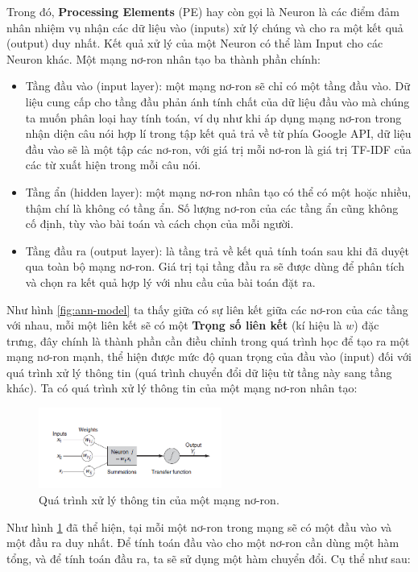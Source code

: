 \documentclass[12pt]{report}
\begin{document}
Trong đó, \textbf{Processing Elements} (PE) hay còn gọi là Neuron là các điểm đảm nhân nhiệm vụ nhận các dữ liệu vào (inputs) xử lý chúng và cho ra một kết quả (output) duy nhất. Kết quả xử lý của một Neuron có thể làm Input cho các Neuron khác. Một mạng nơ-ron nhân tạo ba thành phần chính:

\begin{itemize}
	\item Tầng đầu vào (input layer): một mạng nơ-ron sẽ chỉ có một tầng đầu vào. Dữ liệu cung cấp cho tầng đầu phản ánh tính chất của dữ liệu đầu vào mà chúng ta muốn phân loại hay tính toán, ví dụ như khi áp dụng mạng nơ-ron trong nhận diện câu nói hợp lí trong tập kết quả trả về từ phía Google API, dữ liệu đầu vào sẽ là một tập các nơ-ron, với giá trị mỗi nơ-ron là giá trị TF-IDF của các từ xuất hiện trong mỗi câu nói.
	\item Tầng ẩn (hidden layer): một mạng nơ-ron nhân tạo có thể có một hoặc nhiều, thậm chí là không có tầng ẩn. Số lượng nơ-ron của các tầng ẩn cũng không cố định, tùy vào bài toán và cách chọn của mỗi người.
	\item Tầng đầu ra (output layer): là tầng trả về kết quả tính toán sau khi đã duyệt qua toàn bộ mạng nơ-ron. Giá trị tại tầng đầu ra sẽ được dùng để phân tích và chọn ra kết quả hợp lý với nhu cầu của bài toán đặt ra.
\end{itemize}

Như hình \ref{fig:ann-model} ta thấy giữa có sự liên kết giữa các nơ-ron của các tầng với nhau, mỗi một liên kết sẽ có một \textbf{Trọng số liên kết} (kí hiệu là $w$) đặc trưng, đây chính là thành phần cần điều chỉnh trong quá trình học để tạo ra một mạng nơ-ron mạnh, thể hiện được mức độ quan trọng của đầu vào (input) đối với quá trình xử lý thông tin (quá trình chuyển đổi dữ liệu từ tầng này sang tầng khác). Ta có quá trình xử lý thông tin của một mạng nơ-ron nhân tạo:

\begin{figure}[H]
	\centering
	\includegraphics[width=6cm]{Pics/Chap5/ann-infoprocess.png}
	\caption{Quá trình xử lý thông tin của một mạng nơ-ron.}
	\label{fig:ann-infoprocess}
\end{figure}

Như hình \ref{fig:ann-infoprocess} đã thể hiện, tại mỗi một nơ-ron trong mạng sẽ có một đầu vào và một đầu ra duy nhất. Để tính toán đầu vào cho một nơ-ron cần dùng một hàm tổng, và để tính toán đầu ra, ta sẽ sử dụng một hàm chuyển đổi. Cụ thể như sau:
\end{document}
